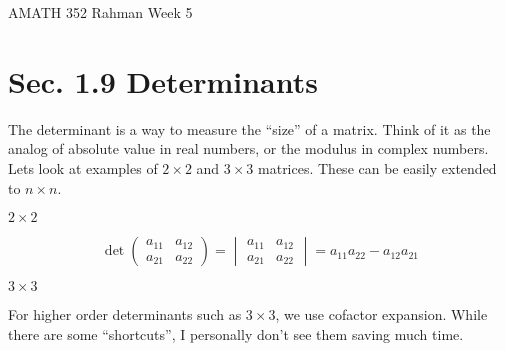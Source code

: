 \documentclass[reqno]{amsart}
\theoremstyle{definition}
\begin{document}
\begin{flushleft}
{\sc \Large AMATH 352 Rahman} \hfill Week 5
\bigskip
\end{flushleft}

\newcommand{\R}{\mathbb{R}}
\newcommand{\N}{\mathbb{N}}
\newcommand{\Z}{\mathbb{Z}}
\newcommand{\Q}{\mathbb{Q}}
\renewcommand{\CancelColor}{\color{red}}
\newcommand{\?}{\stackrel{?}{=}}
\renewcommand{\varphi}{\phi}
\newcommand{\card}{\text{Card}}
\newcommand{\bigzero}{\text{\Huge 0}}
\newcommand{\curvearrowdown}{{\color{red}\rotatebox{90}{$\curvearrowleft$}}}
\newcommand{\curvearrowup}{{\color{red}\rotatebox{90}{$\curvearrowright$}}}



\section*{Sec. 1.9 Determinants}

The determinant is a way to measure the ``size'' of a matrix.  Think of it as the analog of absolute value in real
numbers, or the modulus in complex numbers.  Lets look at examples of $2 \times 2$ and $3 \times 3$ matrices.
These can be easily extended to $n \times n$.

\underline{$2 \times 2$}

\begin{equation}
\det \begin{pmatrix}
a_{11} & a_{12}\\
a_{21} & a_{22}
\end{pmatrix} = \begin{vmatrix}
a_{11} & a_{12}\\
a_{21} & a_{22}
\end{vmatrix} = a_{11}a_{22} - a_{12}a_{21}
\end{equation}

\underline{$3 \times 3$}

For higher order determinants such as $3 \times 3$, we use cofactor expansion.  While there are some
``shortcuts'', I personally don't see them saving much time.
\end{document}
